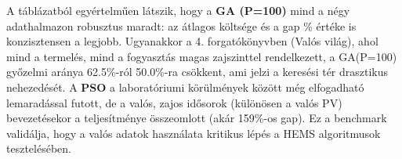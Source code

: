 \begin{table}[H]
\centering
\caption{A 2x2-es benchmark fő eredményei (640 futtatás aggregációja)}
\label{tab:realpv_synth_summary}
\end{table}

A táblázatból egyértelműen látszik, hogy a \textbf{GA (P=100)} mind a négy adathalmazon robusztus maradt: az átlagos költsége és a gap \% értéke is konzisztensen a legjobb. Ugyanakkor a 4. forgatókönyvben (Valós világ), ahol mind a termelés, mind a fogyasztás magas zajszinttel rendelkezett, a GA(P=100) győzelmi aránya 62.5\%-ról 50.0\%-ra csökkent, ami jelzi a keresési tér drasztikus nehezedését. 
A \textbf{PSO} a laboratóriumi körülmények között még elfogadható lemaradással futott, de a valós, zajos idősorok (különösen a valós PV) bevezetésekor a teljesítménye összeomlott (akár 159\%-os gap). Ez a benchmark validálja, hogy a valós adatok használata kritikus lépés a HEMS algoritmusok tesztelésében.

